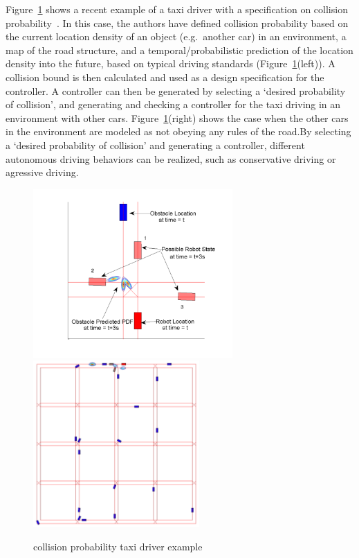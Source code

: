 Figure~\ref{fig:taxi-taxi} shows a recent example of a taxi driver with a specification on collision probability~\cite{johnson2012execution}. In this case, the authors have defined collision probability based on the current location density of an object (e.g.\ another car) in an environment, a map of the road structure, and a temporal/probabilistic prediction of the location density into the future, based on typical driving standards (Figure~\ref{fig:taxi-taxi}(left)). A collision bound is then calculated and used as a design specification for the controller. A controller can then be generated by selecting a `desired probability of collision', and generating and  checking a controller for the taxi driving in an environment with other cars. Figure~\ref{fig:taxi-taxi}(right) shows the case when the other cars in the environment are modeled as not obeying any rules of the road.By selecting a `desired probability of collision' and generating a controller, different autonomous driving behaviors can be realized, such as conservative driving or agressive driving. 


\begin{figure}[h] 
\centering
   \includegraphics[width=3.0in]{coll_prob_inst.pdf} 
   \includegraphics[width=2.5in]{taxi-driver.pdf} 
   \caption{collision probability taxi driver example}
   \label{fig:taxi-taxi}
\end{figure}

